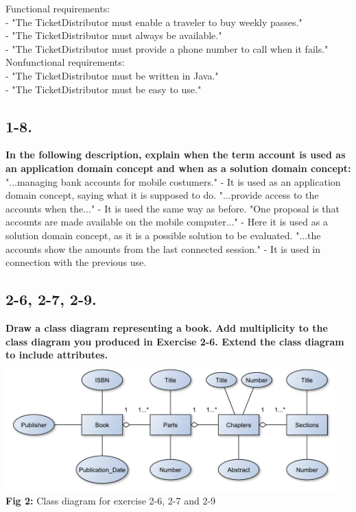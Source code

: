 \documentclass[12pt]{article}
\begin{document}
Functional requirements:\\
- "The TicketDistributor must enable a traveler to buy weekly passes."\\
- "The TicketDistributor must always be available."\\
- "The TicketDistributor must provide a phone number to call when it fails."\\

Nonfunctional requirements:\\
- "The TicketDistributor must be written in Java."\\
- "The TicketDistributor must be easy to use."\\









\subsection{1-8.}
\textbf{In the following description, explain when the term account is used as an application domain concept and when as a solution domain concept:}\\
"...managing bank accounts for mobile costumers." - It is used as an application domain concept, saying what it is supposed to do. 
"...provide access to the accounts when the..." - It is used the same way as before. 
"One proposal is that accounts are made available on the mobile computer..." - Here it is used as a solution domain concept, as it is a possible solution to be evaluated. 
"...the accounts show the amounts from the last connected session." - It is used in connection with the previous use.\\










\newpage
\subsection{2-6, 2-7, 2-9.}
\textbf{Draw a class diagram representing a book. Add multiplicity to the class diagram you produced in Exercise 2-6. Extend the class diagram to include attributes.}\\

\includegraphics[height=50mm]{2-6}\\
\textbf{Fig 2:} Class diagram for exercise 2-6, 2-7 and 2-9
\end{document}
